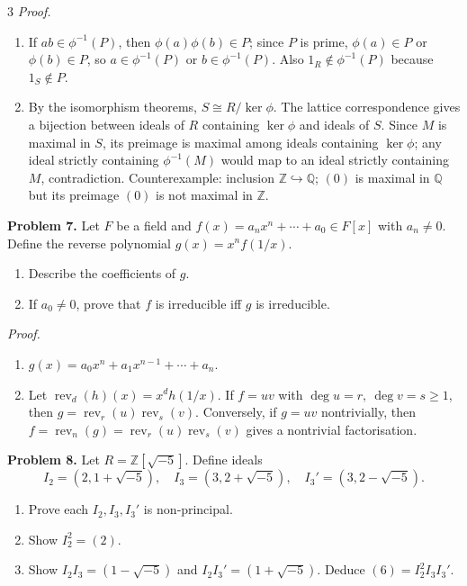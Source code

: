 \documentclass[10pt,landscape]{article}
\begin{document}
\begin{multicols}{3}
\textit{Proof.}
\begin{enumerate}
\item If \(ab\in\phi^{-1}(P)\), then \(\phi(a)\phi(b)\in P\); since \(P\) is prime, \(\phi(a)\in P\) or \(\phi(b)\in P\), so \(a\in\phi^{-1}(P)\) or \(b\in\phi^{-1}(P)\). Also \(1_R\notin\phi^{-1}(P)\) because \(1_S\notin P\).
\item By the isomorphism theorems, \(S\cong R/\ker\phi\). The lattice correspondence gives a bijection between ideals of \(R\) containing \(\ker\phi\) and ideals of \(S\). Since \(M\) is maximal in \(S\), its preimage is maximal among ideals containing \(\ker\phi\); any ideal strictly containing \(\phi^{-1}(M)\) would map to an ideal strictly containing \(M\), contradiction. Counterexample: inclusion \(\mathbb{Z}\hookrightarrow\mathbb{Q}\); \((0)\) is maximal in \(\mathbb{Q}\) but its preimage \((0)\) is not maximal in \(\mathbb{Z}\). 
\end{enumerate}

\noindent\textbf{Problem 7.} Let \(F\) be a field and \(f(x)=a_nx^n+\cdots+a_0\in F[x]\) with \(a_n\neq0\). Define the reverse polynomial \(g(x)=x^nf(1/x)\).
\begin{enumerate}
\item Describe the coefficients of \(g\).
\item If \(a_0\neq0\), prove that \(f\) is irreducible iff \(g\) is irreducible.
\end{enumerate}

\textit{Proof.}
\begin{enumerate}
\item \(g(x)=a_0x^n+a_1x^{n-1}+\cdots+a_n\).
\item Let \(\operatorname{rev}_d(h)(x)=x^dh(1/x)\). If \(f=uv\) with \(\deg u=r,\ \deg v=s\ge1\), then \(g=\operatorname{rev}_r(u)\operatorname{rev}_s(v)\). Conversely, if \(g=uv\) nontrivially, then \(f=\operatorname{rev}_n(g)=\operatorname{rev}_r(u)\operatorname{rev}_s(v)\) gives a nontrivial factorisation. 
\end{enumerate}

\noindent\textbf{Problem 8.} Let \(R=\mathbb{Z}[\sqrt{-5}]\). Define ideals
\[
I_2=(2,1+\sqrt{-5}),\quad I_3=(3,2+\sqrt{-5}),\quad I_3'=(3,2-\sqrt{-5}).
\]
\begin{enumerate}
\item Prove each \(I_2,I_3,I_3'\) is non‑principal.
\item Show \(I_2^2=(2)\).
\item Show \(I_2I_3=(1-\sqrt{-5})\) and \(I_2I_3'=(1+\sqrt{-5})\). Deduce \((6)=I_2^2I_3I_3'\).
\end{enumerate}


\end{multicols}
\end{document}
